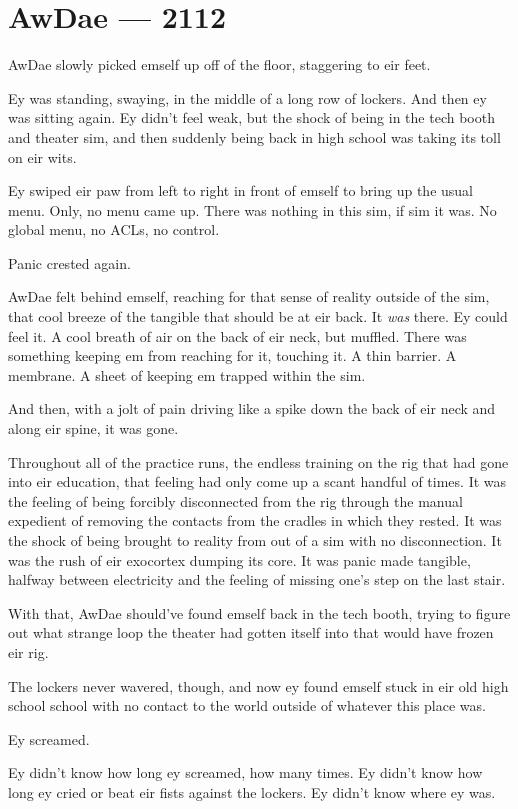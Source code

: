 \chapter*{AwDae — 2112}

AwDae slowly picked emself up off of the floor, staggering to eir feet.

Ey was standing, swaying, in the middle of a long row of lockers. And then ey was sitting again. Ey didn't feel weak, but the shock of being in the tech booth and theater sim, and then suddenly being back in high school was taking its toll on eir wits.

Ey swiped eir paw from left to right in front of emself to bring up the usual menu. Only, no menu came up. There was nothing in this sim, if sim it was. No global menu, no ACLs, no control.

Panic crested again.

AwDae felt behind emself, reaching for that sense of reality outside of the sim, that cool breeze of the tangible that should be at eir back. It \emph{was} there. Ey could feel it. A cool breath of air on the back of eir neck, but muffled. There was something keeping em from reaching for it, touching it. A thin barrier. A membrane. A sheet of keeping em trapped within the sim.

And then, with a jolt of pain driving like a spike down the back of eir neck and along eir spine, it was gone.

Throughout all of the practice runs, the endless training on the rig that had gone into eir education, that feeling had only come up a scant handful of times. It was the feeling of being forcibly disconnected from the rig through the manual expedient of removing the contacts from the cradles in which they rested. It was the shock of being brought to reality from out of a sim with no disconnection. It was the rush of eir exocortex dumping its core. It was panic made tangible, halfway between electricity and the feeling of missing one's step on the last stair.

With that, AwDae should've found emself back in the tech booth, trying to figure out what strange loop the theater had gotten itself into that would have frozen eir rig.

The lockers never wavered, though, and now ey found emself stuck in eir old high school school with no contact to the world outside of whatever this place was.

Ey screamed.

Ey didn't know how long ey screamed, how many times. Ey didn't know how long ey cried or beat eir fists against the lockers. Ey didn't know where ey was.

